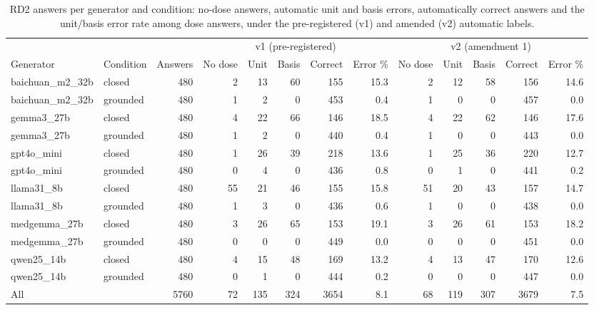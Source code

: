 \begin{table}[t]
\centering
\scriptsize
\caption{RD2 answers per generator and condition: no-dose answers, automatic unit and basis errors, automatically correct answers and the unit/basis error rate among dose answers, under the pre-registered (v1) and amended (v2) automatic labels.}
\label{tab:rd2gen}
\begin{tabular}{llrrrrrrrrrrr}
\toprule
 & & & \multicolumn{5}{c}{v1 (pre-registered)} & \multicolumn{5}{c}{v2 (amendment 1)} \\
\cmidrule(lr){4-8}\cmidrule(lr){9-13}
Generator & Condition & Answers & No dose & Unit & Basis & Correct & Error \% & No dose & Unit & Basis & Correct & Error \% \\
\midrule
baichuan\_m2\_32b & closed & 480 & 2 & 13 & 60 & 155 & 15.3 & 2 & 12 & 58 & 156 & 14.6 \\
baichuan\_m2\_32b & grounded & 480 & 1 & 2 & 0 & 453 & 0.4 & 1 & 0 & 0 & 457 & 0.0 \\
gemma3\_27b & closed & 480 & 4 & 22 & 66 & 146 & 18.5 & 4 & 22 & 62 & 146 & 17.6 \\
gemma3\_27b & grounded & 480 & 1 & 2 & 0 & 440 & 0.4 & 1 & 0 & 0 & 443 & 0.0 \\
gpt4o\_mini & closed & 480 & 1 & 26 & 39 & 218 & 13.6 & 1 & 25 & 36 & 220 & 12.7 \\
gpt4o\_mini & grounded & 480 & 0 & 4 & 0 & 436 & 0.8 & 0 & 1 & 0 & 441 & 0.2 \\
llama31\_8b & closed & 480 & 55 & 21 & 46 & 155 & 15.8 & 51 & 20 & 43 & 157 & 14.7 \\
llama31\_8b & grounded & 480 & 1 & 3 & 0 & 436 & 0.6 & 1 & 0 & 0 & 438 & 0.0 \\
medgemma\_27b & closed & 480 & 3 & 26 & 65 & 153 & 19.1 & 3 & 26 & 61 & 153 & 18.2 \\
medgemma\_27b & grounded & 480 & 0 & 0 & 0 & 449 & 0.0 & 0 & 0 & 0 & 451 & 0.0 \\
qwen25\_14b & closed & 480 & 4 & 15 & 48 & 169 & 13.2 & 4 & 13 & 47 & 170 & 12.6 \\
qwen25\_14b & grounded & 480 & 0 & 1 & 0 & 444 & 0.2 & 0 & 0 & 0 & 447 & 0.0 \\
\midrule
All & & 5760 & 72 & 135 & 324 & 3654 & 8.1 & 68 & 119 & 307 & 3679 & 7.5 \\
\bottomrule
\end{tabular}
\end{table}

